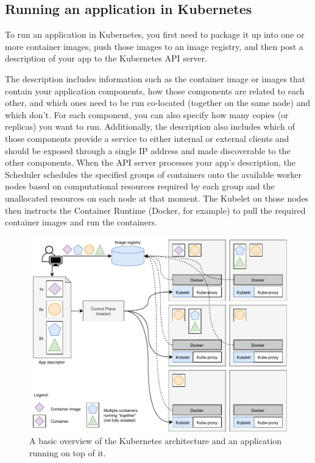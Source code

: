 \subsection{Running an application in Kubernetes}
To run an application in Kubernetes, you first need to package it up into one or more container images, push those images to an image registry, and then post a description of your app to the Kubernetes API server.

The description includes information such as the container image or images that contain your application components, how those components are related to each other, and which ones need to be run co-located (together on the same node) and which don’t. For each component, you can also specify how many copies (or replicas) you want to run. Additionally, the description also includes which of those components provide a service to either internal or external clients and should be exposed through a single IP address and made discoverable to the other components.
When the API server processes your app’s description, the Scheduler schedules the specified groups of containers onto the available worker nodes based on computational resources required by each group and the unallocated resources on each node at that moment. The Kubelet on those nodes then instructs the Container Runtime (Docker, for example) to pull the required container images and run the containers.

\begin{figure}[htbp]
	\centering
	\includegraphics[width=\textwidth]{images/kubedockeroverview.pdf}
	\caption{A basic overview of the Kubernetes architecture and an application running on top of it.}
	\label{fig:kubedockeroverview}
\end{figure}

